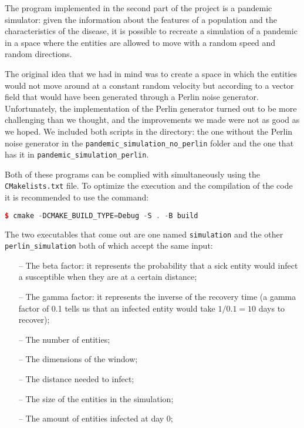 \documentclass[a4paper, 11pt]{article}
\begin{document}
  The program implemented in the second part of the project is a pandemic simulator: given the information about the features of a population and the characteristics of the disease, it is possible to recreate a simulation of a pandemic in a space where the entities are allowed to move with a random speed and random directions.

  The original idea that we had in mind was to create a space in which the entities would not move around at a constant random velocity but according to a vector field that would have been generated through a Perlin noise generator. Unfortunately, the implementation of the Perlin generator turned out to be more challenging than we thought, and the improvements we made were not as good as we hoped. We included both scripts in the directory: the one without the Perlin noise generator in the \verb|pandemic_simulation_no_perlin| folder and the one that has it in \verb|pandemic_simulation_perlin|.

  Both of these programs can be complied with simultaneously using the \verb|CMakelists.txt| file. To optimize the execution and the compilation of the code it is recommended to use the command:
  \begin{lstlisting}[language=C++, style=terminal]
    $ cmake -DCMAKE_BUILD_TYPE=Debug -S . -B build
  \end{lstlisting}

  The two executables that come out are one named \verb|simulation| and the other \verb|perlin_simulation| both of which accept the same input:
  \begin{itemize}
    \item[--]The beta factor: it represents the probability that a sick entity would infect a susceptible when they are at a certain distance;
    \item[--] The gamma factor: it represents the inverse of the recovery time (a gamma factor of 0.1 tells us that an infected entity would take $ 1/0.1 = 10$ days to recover);
    \item[--] The number of entities;
    \item[--] The dimensions of the window;
    \item[--] The distance needed to infect;
    \item[--] The size of the entities in the simulation;
    \item [--] The amount of entities infected at day 0;
  \end{itemize}
\end{document}
